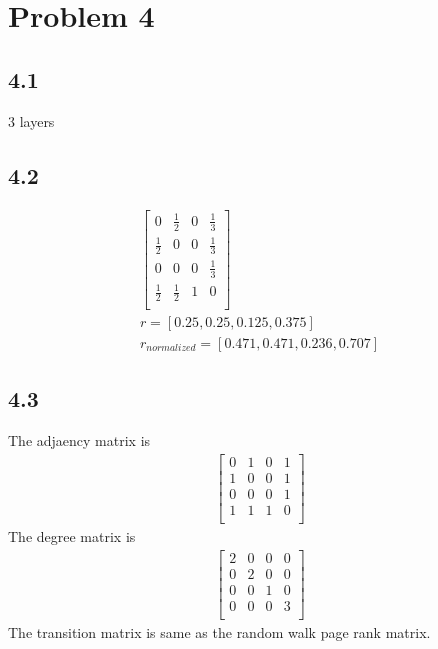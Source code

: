 \documentclass{book}
\begin{document}
\newpage
\section*{Problem 4}
\subsection*{4.1}
3 layers 

\subsection*{4.2}
    \begin{align*}
        \begin{bmatrix}
            0 & \frac{1}{2} & 0 & \frac{1}{3} \\
            \frac{1}{2} & 0 & 0 & \frac{1}{3} \\
            0 & 0 & 0 & \frac{1}{3} \\
            \frac{1}{2} & \frac{1}{2} & 1 & 0 \\
        \end{bmatrix}\\
        r = [0.25, 0.25, 0.125, 0.375]\\
        r_{normalized} = [0.471, 0.471, 0.236, 0.707]
    \end{align*}

\subsection*{4.3}
The adjaency matrix is 
    \begin{align*}
        \begin{bmatrix}
            0 & 1 & 0 & 1 \\
            1 & 0 & 0 & 1 \\
            0 & 0 & 0 & 1 \\
            1 & 1 & 1 & 0 \\
        \end{bmatrix}
    \end{align*}
The degree matrix is 
    \begin{align*}
        \begin{bmatrix}
            2 & 0 & 0 & 0 \\
            0 & 2 & 0 & 0 \\
            0 & 0 & 1 & 0 \\
            0 & 0 & 0 & 3 \\
        \end{bmatrix}
    \end{align*}
The transition matrix is same as the random walk page rank matrix. 
\end{document}
